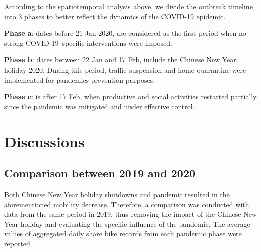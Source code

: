 \documentclass[ijgi,submit,moreauthors,pdftex]{Definitions/mdpi}
\begin{document}
According to the spatiotemporal analysis above, we divide the outbreak timeline into 3 phases to better reflect the dynamics of the COVID-19 epidemic.

\textbf{Phase a}: dates before 21 Jan 2020, are considered as the first period when no strong COVID-19–specific interventions were imposed.

\textbf{Phase b}: dates between 22 Jan and 17 Feb, include the Chinese New Year holiday 2020. During this period, traffic suspension and home quarantine were implemented for pandemics prevention purposes.

\textbf{Phase c}: is after 17 Feb, when productive and social activities restarted partially since the pandemic was mitigated and under effective control.


\section{Discussions}\label{sec:discussions}
\subsection{Comparison between 2019 and 2020}%

Both Chinese New Year holiday shutdowns and pandemic resulted in the aforementioned mobility decrease.
Therefore, a comparison was conducted with data from the same period in 2019, thus removing the impact of the Chinese New Year holiday and evaluating the specific influence of the pandemic.  
The average values of aggregated daily share bike records from each pandemic phase were reported.
\end{document}
